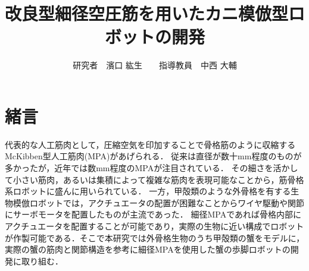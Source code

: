 \documentclass{jarticle}
\begin{document}

\title{
改良型細径空圧筋を用いたカニ模倣型ロボットの開発
}
\author{
\centering
研究者　濱口 紘生　　指導教員　中西 大輔
}

\maketitle

\thispagestyle{empty}  %

\section{緒言}

代表的な人工筋肉として，圧縮空気を印加することで骨格筋のように収縮するMcKibben型人工筋肉(MPA)があげられる．
従来は直径が数十mm程度のものが多かったが，近年では数mm程度のMPAが注目されている\cite{wakimoto}．
その細さを活かして小さい筋肉，あるいは集積によって複雑な筋肉を表現可能なことから，筋骨格系ロボットに盛んに用いられている\cite{wakimoto}．
一方，甲殻類のような外骨格を有する生物模倣ロボットでは，アクチュエータの配置が困難なことからワイヤ駆動や関節にサーボモータを配置したものが主流であった\cite{crabrobot1}．
細径MPAであれば骨格内部にアクチュエータを配置することが可能であり，実際の生物に近い構成でロボットが作製可能である．そこで本研究では外骨格生物のうち甲殻類の蟹をモデルに，
実際の蟹の筋肉と関節構造を参考に細径MPAを使用した蟹の歩脚ロボットの開発に取り組む．


\end{document}

